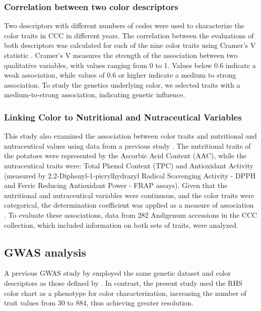 \documentclass[pdflatex,sn-mathphys-ay]{sn-jnl}%
\begin{document}
\subsubsection*{Correlation between two color descriptors}
Two descriptors with different numbers of codes were used to characterize the color traits in CCC in different years. The correlation between the evaluations of both descriptors was calculated for each of the nine color traits using Cramer's V statistic \citep{Lyman1986}. Cramer's V measures the strength of the association between two qualitative variables, with values ranging from 0 to 1. Values below 0.6 indicate a weak association, while values of 0.6 or higher indicate a medium to strong association. To study the genetics underlying color, we selected traits with a medium-to-strong association, indicating genetic influence.


\subsubsection*{Linking Color to Nutritional and Nutraceutical Variables}

This study also examined the association between color traits and nutritional and nutraceutical values using data from a previous study \cite{berdugo2023phenotypic}. The nutritional traits of the potatoes were represented by the Ascorbic Acid Content (AAC), while the nutraceutical traits were: Total Phenol Content (TPC) and Antioxidant Activity (measured by 2.2-Diphenyl-1-picrylhydrazyl Radical Scavenging Activity - DPPH and Ferric Reducing Antioxidant Power - FRAP assays). Given that the nutritional and nutraceutical variables were continuous, and the color traits were categorical, the determination coefficient was applied as a measure of association \cite{nagelkerke1991note}. To evaluate these associations, data from 282 Andigenum accessions in the CCC collection, which included information on both sets of traits, were analyzed.


\subsection{GWAS analysis \label{subsec:GWAS-process} }




A previous GWAS study by \cite{Berdugo2017} employed the same genetic dataset and color descriptors as those defined by \cite{gomez2000guia}. In contrast, the present study used the RHS color chart as a phenotype for color characterization, increasing the number of trait values from 30 to 884, thus achieving greater resolution.
\end{document}
